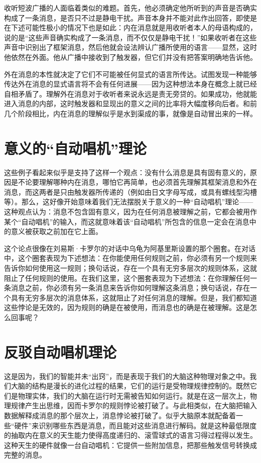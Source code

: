 收听短波广播的人面临着类似的难题。首先，他必须确定他所听到的声音是否确实构成了一条消息，是否只不过是静电干扰。声音本身并不能对此作出回答，即使是在下述可能性极小的情况下也是如此：内在消息就是用收听者本人的母语构成的，说的是“这些声音确实构成了一条消息，而不仅仅是静电干扰！”如果收听者在这些声音中识别出了框架消息，然后他就会设法辨认广播所使用的语言——显然，这时他依然在外面。他从广播中接收到了触发器，但它们并没有把答案明确地告诉他。

外在消息的本性就决定了它们不可能被任何显式的语言所传达。试图发现一种能够传达外在消息的显式语言将不会有任何进展——因为这种想法本身在概念上就已经自相矛盾了。理解外在消息对于收听者来说永远是责无旁贷的。如果成功，他就能进入消息的内部，这时触发器和显现出的意义之间的比率将大幅度移向后者。和前几个阶段相比，内在消息的理解似乎是水到渠成的事，就像是自动冒出来的一样。

\section{意义的“自动唱机”理论}

这些例子看起来似乎是支持了这样一个观点：没有什么消息是具有固有意义的，原因是不论要理解哪种内在消息，哪怕它再简单，也必须首先理解其框架消息和外在消息，而这两者是只由触发器所传递的（例如由日文字母写成，或具有螺线型沟槽等）。那么，这好像开始意味着我们无法摆脱关于意义的一种“自动唱机”理论——这种观点认为：消息不包含固有意义，因为在任何消息被理解之前，它都会被用作某个“自动唱机”的输入，而这就意味着该“自动唱机”所包含的信息一定会在消息中的意义被获取之前加在它上面。

这个论点很像在刘易斯·卡罗尔的对话中乌龟为阿基里斯设置的那个圈套。在对话中，这个圈套表现为下述想法：在你能使用任何规则之前，你必须有另一个规则来告诉你如何使用这一规则；换句话说，存在一个具有无穷多层次的规则体系，这就阻止了任何规则的使用。在我们这里，这个圈套表现为下述想法：在你理解任何一条消息之前，你必须有另一条消息来告诉你如何理解这条消息；换句话说，存在一个具有无穷多层次的消息体系，这就阻止了对任何消息的理解。但是，我们都知道这些悖论是无效的，因为规则的确是在被使用，而消息也的确是在被理解。这是怎么回事呢？

\section{反驳自动唱机理论}

这是因为，我们的智能并未“出窍”，而是表现于我们的大脑这种物理对象之中。我们大脑的结构是漫长的进化过程的结果，它们的运行是受物理规律控制的。既然它们是物理实体，我们的大脑在运行时无需被告知如何运行。就是在这一层次上，物理规律产生出思维，因而卡罗尔的规则悖论被打破了。与此相类似，在大脑把输入数据解释成消息的那个层次上，消息悖论被打破了。似乎大脑原本就配备着一些“硬件”来识别哪些东西是消息，而且能对这些消息进行解码。就是这种最低限度的抽取内在意义的天生能力使得高度递归的、滚雪球式的语言习得过程得以发生。这种天生的硬件就像一台自动唱机：它提供一些附加信息，把那些触发信号转换成完整的消息。

